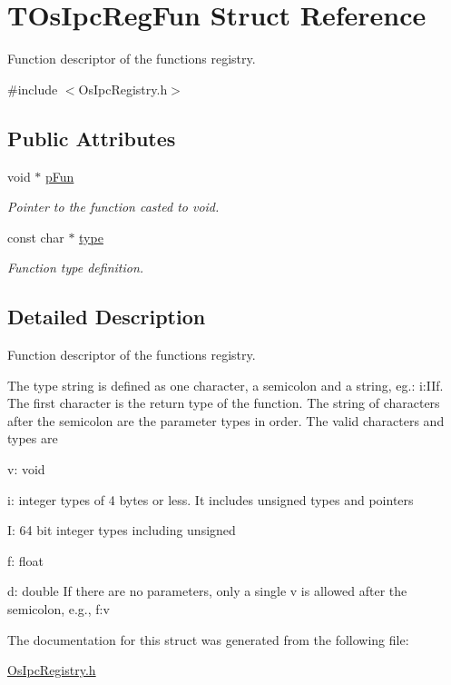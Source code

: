 \hypertarget{structTOsIpcRegFun}{}\section{T\+Os\+Ipc\+Reg\+Fun Struct Reference}
\label{structTOsIpcRegFun}


Function descriptor of the functions registry.  




{\ttfamily \#include $<$Os\+Ipc\+Registry.\+h$>$}

\subsection*{Public Attributes}
\begin{DoxyCompactItemize}
\item 
\mbox{\label{structTOsIpcRegFun_a5f832c2518de98fa144f23d5cc56b82b}} 
void $\ast$ \hyperlink{structTOsIpcRegFun_a5f832c2518de98fa144f23d5cc56b82b}{p\+Fun}
\begin{DoxyCompactList}\small\item\em Pointer to the function casted to void. \end{DoxyCompactList}\item 
\mbox{\label{structTOsIpcRegFun_a90cf4b78efb7a0be08c9abd8c3c9a02c}} 
const char $\ast$ \hyperlink{structTOsIpcRegFun_a90cf4b78efb7a0be08c9abd8c3c9a02c}{type}
\begin{DoxyCompactList}\small\item\em Function type definition. \end{DoxyCompactList}\end{DoxyCompactItemize}


\subsection{Detailed Description}
Function descriptor of the functions registry. 

The {\ttfamily type} string is defined as one character, a semicolon and a string, eg.\+: i\+:I\+If. The first character is the return type of the function. The string of characters after the semicolon are the parameter types in order. The valid characters and types are
\begin{DoxyItemize}
\item v\+: void
\item i\+: integer types of 4 bytes or less. It includes unsigned types and pointers
\item I\+: 64 bit integer types including unsigned
\item f\+: float
\item d\+: double If there are no parameters, only a single \textquotesingle{}v\textquotesingle{} is allowed after the semicolon, e.\+g., f\+:v 
\end{DoxyItemize}

The documentation for this struct was generated from the following file\+:\begin{DoxyCompactItemize}
\item 
\hyperlink{OsIpcRegistry_8h}{Os\+Ipc\+Registry.\+h}\end{DoxyCompactItemize}
